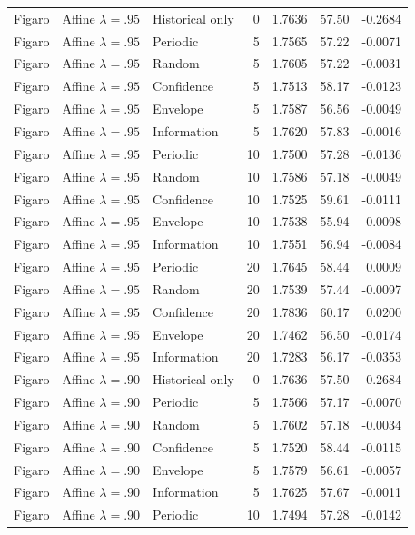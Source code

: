 \begin{longtable}{lllrrrr}
Figaro & Affine $\lambda=.95$ & Historical only & 0 & 1.7636 & 57.50 & -0.2684 \\
Figaro & Affine $\lambda=.95$ & Periodic & 5 & 1.7565 & 57.22 & -0.0071 \\
Figaro & Affine $\lambda=.95$ & Random & 5 & 1.7605 & 57.22 & -0.0031 \\
Figaro & Affine $\lambda=.95$ & Confidence & 5 & 1.7513 & 58.17 & -0.0123 \\
Figaro & Affine $\lambda=.95$ & Envelope & 5 & 1.7587 & 56.56 & -0.0049 \\
Figaro & Affine $\lambda=.95$ & Information & 5 & 1.7620 & 57.83 & -0.0016 \\
Figaro & Affine $\lambda=.95$ & Periodic & 10 & 1.7500 & 57.28 & -0.0136 \\
Figaro & Affine $\lambda=.95$ & Random & 10 & 1.7586 & 57.18 & -0.0049 \\
Figaro & Affine $\lambda=.95$ & Confidence & 10 & 1.7525 & 59.61 & -0.0111 \\
Figaro & Affine $\lambda=.95$ & Envelope & 10 & 1.7538 & 55.94 & -0.0098 \\
Figaro & Affine $\lambda=.95$ & Information & 10 & 1.7551 & 56.94 & -0.0084 \\
Figaro & Affine $\lambda=.95$ & Periodic & 20 & 1.7645 & 58.44 & 0.0009 \\
Figaro & Affine $\lambda=.95$ & Random & 20 & 1.7539 & 57.44 & -0.0097 \\
Figaro & Affine $\lambda=.95$ & Confidence & 20 & 1.7836 & 60.17 & 0.0200 \\
Figaro & Affine $\lambda=.95$ & Envelope & 20 & 1.7462 & 56.50 & -0.0174 \\
Figaro & Affine $\lambda=.95$ & Information & 20 & 1.7283 & 56.17 & -0.0353 \\
Figaro & Affine $\lambda=.90$ & Historical only & 0 & 1.7636 & 57.50 & -0.2684 \\
Figaro & Affine $\lambda=.90$ & Periodic & 5 & 1.7566 & 57.17 & -0.0070 \\
Figaro & Affine $\lambda=.90$ & Random & 5 & 1.7602 & 57.18 & -0.0034 \\
Figaro & Affine $\lambda=.90$ & Confidence & 5 & 1.7520 & 58.44 & -0.0115 \\
Figaro & Affine $\lambda=.90$ & Envelope & 5 & 1.7579 & 56.61 & -0.0057 \\
Figaro & Affine $\lambda=.90$ & Information & 5 & 1.7625 & 57.67 & -0.0011 \\
Figaro & Affine $\lambda=.90$ & Periodic & 10 & 1.7494 & 57.28 & -0.0142 \\

\end{longtable}
